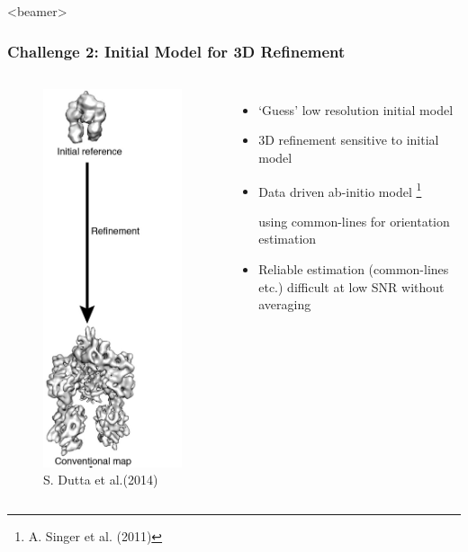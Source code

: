 \documentclass{beamer}
\newcommand\blfootnote[1]{%
  \begingroup
  \renewcommand\thefootnote{}\footnote{#1}%
  \addtocounter{footnote}{-1}%
  \endgroup
}
\begin{document}
\begin{frame}<beamer>
\frametitle{Challenge 2: Initial Model for 3D Refinement}
\begin{columns}
\begin{figure}
\centering
\includegraphics[width=.4 \columnwidth]{figures/refinement.png}\caption{S. Dutta et al.(2014)}
\end{figure}
\begin{itemize}
\item `Guess' low resolution initial model
 \item 3D refinement sensitive to initial model
 \item Data driven ab-initio model \blfootnote{ A. Singer et al. (2011)} using common-lines for orientation estimation
 \item Reliable estimation (common-lines etc.) difficult at low SNR without averaging
\end{itemize}
\end{columns}
\end{frame}
\end{document}
